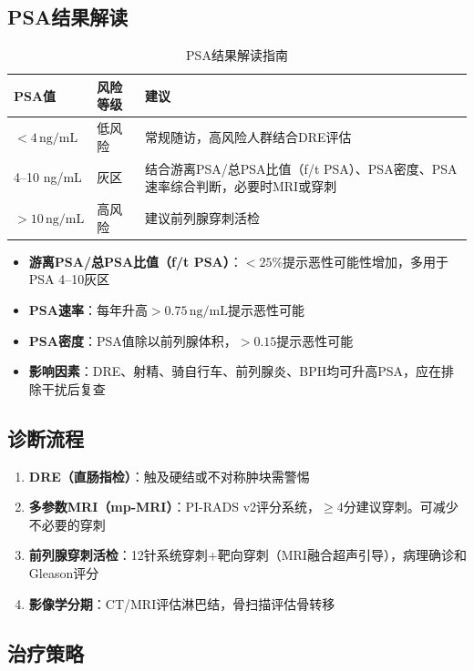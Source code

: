 \subsection{PSA结果解读}

\begin{table}[htbp]
\centering
\caption{PSA结果解读指南}
\label{tab:psa_interpretation}
\begin{tabularx}{\textwidth}{@{}llX@{}}
    \toprule
    \textbf{PSA值} & \textbf{风险等级} & \textbf{建议} \\
    \midrule
    $<4\,\mathrm{ng/mL}$ & 低风险 & 常规随访，高风险人群结合DRE评估 \\
    4--10 ng/mL & 灰区 & 结合游离PSA/总PSA比值（f/t PSA）、PSA密度、PSA速率综合判断，必要时MRI或穿刺 \\
    $>10\,\mathrm{ng/mL}$ & 高风险 & 建议前列腺穿刺活检 \\
    \bottomrule
\end{tabularx}
\end{table}

\begin{itemize}[leftmargin=2cm]
	\item \textbf{游离PSA/总PSA比值（f/t PSA）}：$<25\%$提示恶性可能性增加，多用于PSA 4--10灰区
	\item \textbf{PSA速率}：每年升高$>0.75\,\mathrm{ng/mL}$提示恶性可能
	\item \textbf{PSA密度}：PSA值除以前列腺体积，$>0.15$提示恶性可能
	\item \textbf{影响因素}：DRE、射精、骑自行车、前列腺炎、BPH均可升高PSA，应在排除干扰后复查
\end{itemize}

\subsection{诊断流程}

\begin{enumerate}
	\item \textbf{DRE（直肠指检）}：触及硬结或不对称肿块需警惕
	\item \textbf{多参数MRI（mp-MRI）}：PI-RADS v2评分系统，$\geq$4分建议穿刺。可减少不必要的穿刺
	\item \textbf{前列腺穿刺活检}：12针系统穿刺+靶向穿刺（MRI融合超声引导），病理确诊和Gleason评分
	\item \textbf{影像学分期}：CT/MRI评估淋巴结，骨扫描评估骨转移
\end{enumerate}

\subsection{治疗策略}

